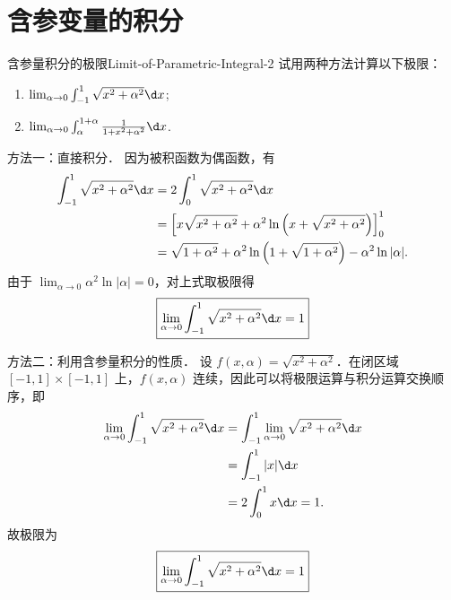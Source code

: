 \section{含参变量的积分}

\begin{problem}{含参量积分的极限}{Limit-of-Parametric-Integral-2}
    试用两种方法计算以下极限：
    \begin{enumerate}
        \item $\lim_{\alpha \to 0} \int_{-1}^{1} \sqrt{x^2 + \alpha^2} \d x$;
        \item $\lim_{\alpha \to 0} \int_{\alpha}^{1+\alpha} \frac{1}{1 + x^2 + \alpha^2} \d x$.
    \end{enumerate}
\end{problem}

\begin{solution}

    方法一：直接积分．
    因为被积函数为偶函数，有
    \begin{equation}
        \begin{aligned}
            \int_{-1}^{1} \sqrt{x^2 + \alpha^2} \d x & = 2 \int_{0}^{1} \sqrt{x^2 + \alpha^2} \d x                                                          \\
                                                     & = \left[ x\sqrt{x^2 + \alpha^2} + \alpha^2 \ln\left(x + \sqrt{x^2 + \alpha^2}\right) \right]_{0}^{1} \\
                                                     & = \sqrt{1 + \alpha^2} + \alpha^2 \ln\left(1 + \sqrt{1 + \alpha^2}\right) - \alpha^2 \ln|\alpha|.
        \end{aligned}
    \end{equation}
    由于 $\lim_{\alpha \to 0} \alpha^2 \ln|\alpha| = 0$，对上式取极限得
    \begin{equation}
        \boxed{\lim_{\alpha \to 0} \int_{-1}^{1} \sqrt{x^2 + \alpha^2} \d x = 1}
    \end{equation}

    方法二：利用含参量积分的性质．
    设 $f(x, \alpha) = \sqrt{x^2 + \alpha^2}$．在闭区域 $[-1, 1] \times [-1, 1]$ 上，$f(x, \alpha)$ 连续，因此可以将极限运算与积分运算交换顺序，即
    \begin{equation}
        \begin{aligned}
            \lim_{\alpha \to 0} \int_{-1}^{1} \sqrt{x^2 + \alpha^2} \d x & = \int_{-1}^{1} \lim_{\alpha \to 0} \sqrt{x^2 + \alpha^2} \d x \\
                                                                         & = \int_{-1}^{1} |x| \d x                                       \\
                                                                         & = 2 \int_{0}^{1} x \d x = 1.
        \end{aligned}
    \end{equation}
    故极限为
    \begin{equation}
        \boxed{\lim_{\alpha \to 0} \int_{-1}^{1} \sqrt{x^2 + \alpha^2} \d x = 1}
    \end{equation}


\end{solution}
